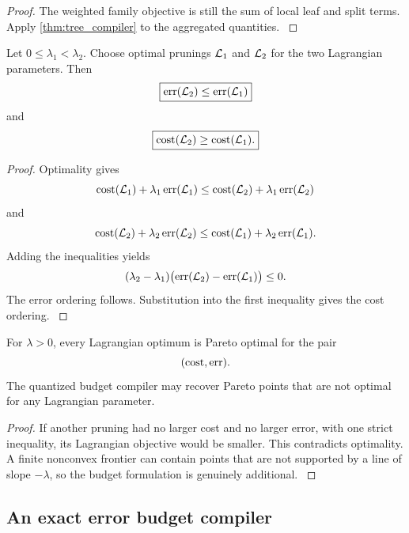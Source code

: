 \begin{proof}\label{main:proof:044}
The weighted family objective is still the sum of local leaf and split terms. Apply \cref{thm:tree_compiler} to the aggregated quantities.
\label{main:proof:044:end}\end{proof}

\begin{proposition}\label{main:proposition:009}\label{prop:lagrangian_frontier}
Let \(0\leq\lambda_1<\lambda_2\). Choose optimal prunings \(\Lcal_1\) and \(\Lcal_2\) for the two Lagrangian parameters. Then
\[
\boxed{
\err(\Lcal_2)
\leq
\err(\Lcal_1)
}
\]
and
\[
\boxed{
\cost(\Lcal_2)
\geq
\cost(\Lcal_1).
}
\]
\end{proposition}

\begin{proof}\label{main:proof:045}
Optimality gives
\[
\cost(\Lcal_1)+\lambda_1\err(\Lcal_1)
\leq
\cost(\Lcal_2)+\lambda_1\err(\Lcal_2)
\]
and
\[
\cost(\Lcal_2)+\lambda_2\err(\Lcal_2)
\leq
\cost(\Lcal_1)+\lambda_2\err(\Lcal_1).
\]
Adding the inequalities yields
\[
(\lambda_2-\lambda_1)
\bigl(
\err(\Lcal_2)-\err(\Lcal_1)
\bigr)
\leq0.
\]
The error ordering follows. Substitution into the first inequality gives the cost ordering.
\label{main:proof:045:end}\end{proof}

\begin{corollary}\label{main:corollary:014}\label{cor:supported_pareto}
For \(\lambda>0\), every Lagrangian optimum is Pareto optimal for the pair
\[
(\operatorname{cost},\operatorname{err}).
\]
The quantized budget compiler may recover Pareto points that are not optimal for any Lagrangian parameter.
\end{corollary}

\begin{proof}\label{main:proof:046}
If another pruning had no larger cost and no larger error, with one strict inequality, its Lagrangian objective would be smaller. This contradicts optimality. A finite nonconvex frontier can contain points that are not supported by a line of slope \(-\lambda\), so the budget formulation is genuinely additional.
\label{main:proof:046:end}\end{proof}

\subsection{An exact error budget compiler}\label{main:subsection:014}

